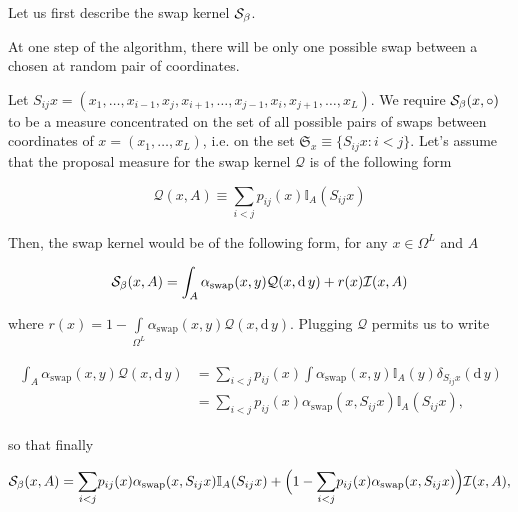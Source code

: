 	Let us first describe the swap kernel $\mathcal{S}_{\beta}$. 
\begin{assumptions}[resume]
	\item At one step of the algorithm, there will be only one possible swap between a chosen at random pair of coordinates.
\end{assumptions}
	
	Let $S_{ij} x = (x_1, \dots, x_{i-1}, x_j, x_{i+1}, \dots, x_{j-1}, x_i, x_{j+1}, \dots, x_L)$. 
	We require $\mathcal{S}_{\beta}(x, \circ )$ to be a measure concentrated on the set of all possible pairs of swaps between coordinates of $x = (x_1, \dots, x_L)$, i.e. on the set $\mathfrak{S}_x \equiv \{ S_{ij}x : i < j  \}$. Let's assume that the proposal measure for the swap kernel $\mathcal{Q}$ is of the following form 
	
\begin{equation*}
	\mathcal{Q}(x, A) \equiv \underset{i < j}{\sum} p_{ij}(x) \mathbb{I}_A (S_{ij} x)
\end{equation*}	 

	Then, the swap kernel would be of the following form, for any $x \in \Omega^L$ and $A$
	
\begin{equation*}
	\mathcal{S}_{\beta}(x,A) = \int_{A} \alpha_\text{swap} (x,y) \mathcal{Q}(x, \mathrm{d}\,y) + r(x) \mathcal{I}(x,A)
\end{equation*}	
	
	where $r(x) = 1 - \underset{\Omega^L}{\int} \alpha_\text{swap} (x,y) \mathcal{Q}(x, \mathrm{d}\,y) $. Plugging $\mathcal{Q}$ permits us to write
	
\begin{align*}
	\begin{split}
	\int_{A} \alpha_\text{swap} (x,y) \mathcal{Q}(x, \mathrm{d}\,y) &= \underset{ i < j}{\sum} p_{ij}(x) \int \alpha_\text{swap} (x,y) \mathbb{I}_A (y) \delta_{S_{ij}x}(\mathrm{d}\, y) \\ &= \underset{ i < j}{\sum} p_{ij}(x) \alpha_\text{swap} (x, S_{ij}x) \mathbb{I}_A(S_{ij} x),
	\end{split}
\end{align*}	

	so that finally
	
\begin{equation*}
	\mathcal{S}_{\beta}(x,A) = \underset{ i < j}{\sum} p_{ij}(x) \alpha_\text{swap} (x, S_{ij}x) \mathbb{I}_A(S_{ij} x) + \Big( 1 - \underset{ i < j}{\sum} p_{ij}(x) \alpha_\text{swap} (x, S_{ij}x)\Big) \mathcal{I}(x,A),
\end{equation*}	
	
